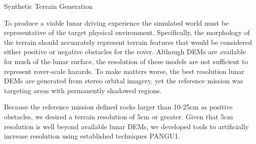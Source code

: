 \documentclass[twocolumn,letterpaper]{IEEEAerospaceCLS}  %
\begin{document}
  
  
Synthetic Terrain Generation

To produce a viable lunar driving experience the simulated world must be representative of the target physical environment. Specifically, the morphology of the terrain should accuarately represent terrain features that would be considered either positive or negative obstacles for the rover. Although DEMs are available for much of the lunar surface, the resolution of these models are not sufficient to represent rover-scale hazards. To make matters worse, the best resolution lunar DEMs are generated from stereo orbital imagery, yet the reference mission was targeting areas with permanently shadowed regions. 

Because the reference mission defined rocks larger than 10-25cm as positive obstacles, we desired a terrain resolution of 5cm or greater. Given that 5cm resolution is well beyond available lunar DEMs, we developed tools to artificially increase resolution using established techniques {PANGU1}. 



  
  
\end{document}
